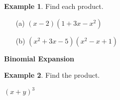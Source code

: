 \documentclass{report}
\theoremstyle{definition}
\newtheorem{example}{\bf Example}
\begin{document}
\vfill

\begin{example}
Find each product.
\end{example}
\begin{minipage}[t]{0.45\linewidth}
	\begin{itemize}
		\item[(a)] $(x-2)(1+3x-x^2)$
	\end{itemize}
\end{minipage}
\begin{minipage}[t]{0.45\linewidth}
	\begin{itemize}
		\item[(b)] $(x^2+3x-5)(x^2-x+1)$
	\end{itemize}
\end{minipage}
\vfill

\noindent\large \textbf{Binomial Expansion}\normalsize
\begin{example}
Find the product.
\end{example}
$(x+y)^3$
\vfill

 \newpage
\end{document}
